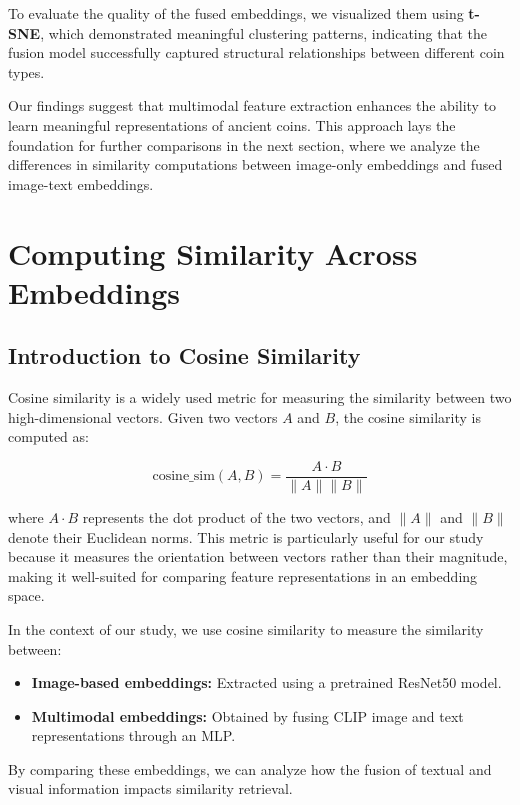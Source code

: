 \documentclass[nolibertine, english, algorithm, nomencl, minted]{ttlab-qualify}
\begin{document}
To evaluate the quality of the fused embeddings, we visualized them using \textbf{t-SNE}, which demonstrated meaningful 
clustering patterns, indicating that the fusion model successfully captured structural relationships between different coin types.

Our findings suggest that multimodal feature extraction enhances the ability to learn meaningful representations of ancient coins. 
This approach lays the foundation for further comparisons in the next section, where we analyze the differences in similarity 
computations between image-only embeddings and fused image-text embeddings.


\section{Computing Similarity Across Embeddings}

\subsection{Introduction to Cosine Similarity}
Cosine similarity is a widely used metric for measuring the similarity between two high-dimensional vectors. 
Given two vectors \( A \) and \( B \), the cosine similarity is computed as:

\begin{equation}
\text{cosine\_sim}(A, B) = \frac{A \cdot B}{\|A\| \|B\|}
\end{equation}

where \( A \cdot B \) represents the dot product of the two vectors, 
and \( \|A\| \) and \( \|B\| \) denote their Euclidean norms. 
This metric is particularly useful for our study because it measures the orientation between vectors rather than their magnitude, 
making it well-suited for comparing feature representations in an embedding space.

In the context of our study, we use cosine similarity to measure the similarity between:
\begin{itemize}
    \item \textbf{Image-based embeddings:} Extracted using a pretrained ResNet50 model.
    \item \textbf{Multimodal embeddings:} Obtained by fusing CLIP image and text representations through an MLP.
\end{itemize}

By comparing these embeddings, we can analyze how the fusion of textual and visual information impacts similarity retrieval.
\end{document}
